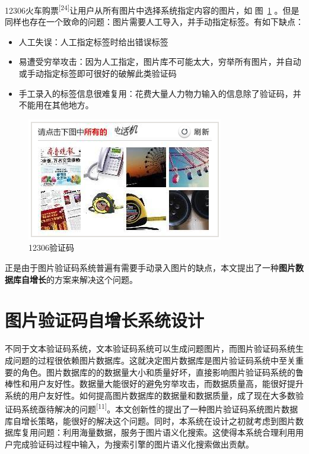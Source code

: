 \documentclass[bachelor,zhspacing]{cqu}  %
\def\tightlist{}
\begin{document}
12306火车购票\textsuperscript{{[}24{]}}让用户从所有图片中选择系统指定内容的图片，如
图~\ref{fig:12306captcha}
。但是同样也存在一个致命的问题：图片需要人工导入，并手动指定标签。有如下缺点：

\begin{itemize}
\tightlist
\item
  人工失误：人工指定标签时给出错误标签
\item
  易遭受穷举攻击：因为人工指定，图片库不可能太大，穷举所有图片，并自动或手动指定标签即可很好的破解此类验证码
\item
  手工录入的标签信息很难复用：花费大量人力物力输入的信息除了验证码，并不能用在其他地方。
\end{itemize}

\begin{figure}[htbp]
\centering
\includegraphics{pic/12306captcha.png}
\caption{12306验证码}\label{fig:12306captcha}
\end{figure}

正是由于图片验证码系统普遍有需要手动录入图片的缺点，本文提出了一种\textbf{图片数据库自增长}的方案来解决这个问题。

\section{图片验证码自增长系统设计}\label{ux56feux7247ux9a8cux8bc1ux7801ux81eaux589eux957fux7cfbux7edfux8bbeux8ba1}

不同于文本验证码系统，文本验证码系统可以生成问题图片，而图片验证码系统生成问题的过程很依赖图片数据库。这就决定图片数据库是图片验证码系统中至关重要的角色。图片数据库的的数据量大小和质量好坏，直接影响图片验证码系统的鲁棒性和用户友好性。数据量大能很好的避免穷举攻击，而数据质量高，能很好提升系统的用户友好性。如何提高图片数据库的数据量和数据质量，成了现在大多数验证码系统亟待解决的问题\textsuperscript{{[}11{]}}。本文创新性的提出了一种图片验证码系统图片数据库自增长策略，能很好的解决这个问题。同时，本系统在设计之初就考虑到图片数据库复用问题：利用海量数据，服务于图片语义化搜索。这使得本系统合理利用用户完成验证码过程中输入，为搜索引擎的图片语义化搜索做出贡献。
\end{document}
